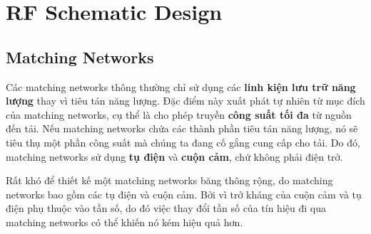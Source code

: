 \chapter{RF Schematic Design}
    \section{Matching Networks}
        Các matching networks thông thường chỉ sử dụng các \textbf{linh kiện lưu trữ năng lượng} 
        thay vì tiêu tán năng lượng. Đặc điểm này xuất phát tự nhiên từ mục đích 
        của matching networks, cụ thể là cho phép truyền \textbf{công suất tối đa} từ nguồn đến tải. 
        Nếu matching networks chứa các thành phần tiêu tán năng lượng, nó sẽ tiêu thụ một phần công suất 
        mà chúng ta đang cố gắng cung cấp cho tải. Do đó, matching networks sử dụng \textbf{tụ điện} 
        và \textbf{cuộn cảm}, chứ không phải điện trở.\cite{allaboutcircuits_matchingNetworks}\par

        Rất khó để thiết kế một matching networks băng thông rộng, do matching networks bao gồm các tụ điện và cuộn cảm.
        Bởi vì trở kháng của cuộn cảm và tụ điện phụ thuộc vào tần số, do đó việc thay đổi tần số của tín hiệu đi qua matching networks 
        có thể khiến nó kém hiệu quả hơn.\par